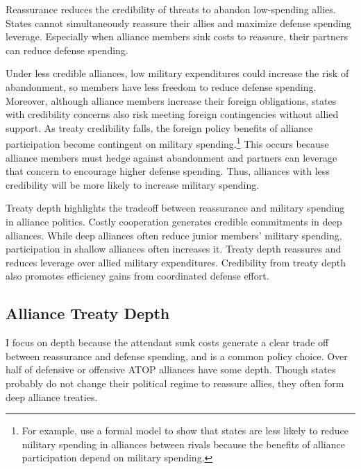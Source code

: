 \documentclass[12pt]{article}
\begin{document}
Reassurance reduces the credibility of threats to abandon low-spending allies. 
States cannot simultaneously reassure their allies and maximize defense spending leverage. 
Especially when alliance members sink costs to reassure, their partners can reduce defense spending. 


Under less credible alliances, low military expenditures could increase the risk of abandonment, so members have less freedom to reduce defense spending. 
Moreover, although alliance members increase their foreign obligations, states with credibility concerns also risk meeting foreign contingencies without allied support. 
As treaty credibility falls, the foreign policy benefits of alliance participation become contingent on military spending.\footnote{For example, \citep{NiouZeigler2019} use a formal model to show that states are less likely to reduce military spending in alliances between rivals because the benefits of alliance participation depend on military spending.} 
This occurs because alliance members must hedge against abandonment and partners can leverage that concern to encourage higher defense spending.
Thus, alliances with less credibility will be more likely to increase military spending. 


Treaty depth highlights the tradeoff between reassurance and military spending in alliance politics.
Costly cooperation generates credible commitments in deep alliances. 
While deep alliances often reduce junior members' military spending, participation in shallow alliances often increases it. 
Treaty depth reassures and reduces leverage over allied military expenditures. 
Credibility from treaty depth also promotes efficiency gains from coordinated defense effort. 


\subsection{Alliance Treaty Depth} 


I focus on depth because the attendant sunk costs generate a clear trade off between reassurance and defense spending, and is a common policy choice.
Over half of defensive or offensive ATOP alliances have some depth. 
Though states probably do not change their political regime to reassure allies, they often form deep alliance treaties. 
\end{document}
